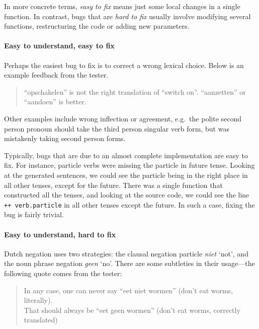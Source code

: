 In more concrete terms, \emph{easy to fix} means just some local changes
in a single function. In contrast, bugs that are \emph{hard to fix}
usually involve modifying several functions, restructuring the code or
adding new parameters.

\paragraph{Easy to understand, easy to
fix}\label{easy-to-understand-easy-to-fix}

Perhaps the easiest bug to fix is to correct a wrong lexical choice.
Below is an example feedback from the tester.

\begin{quote}
``opschakelen'' is not the right translation of ``switch on''.
``aanzetten'' or ``aandoen'' is better.
\end{quote}

Other examples include wrong inflection or agreement, e.g.~the polite
second person pronoun should take the third person singular verb form,
but was mistakenly taking second person forms.

Typically, bugs that are due to an almost complete implementation are
easy to fix. For instance, particle verbs were missing the particle in
future tense. Looking at the generated sentences, we could see the
particle being in the right place in all other tenses, except for the
future. There was a single function that constructed all the tenses, and
looking at the source code, we could see the line
\texttt{++ verb.particle} in all other tenses except the future. In such
a case, fixing the bug is fairly trivial.

\paragraph{Easy to understand, hard to
fix}\label{easy-to-understand-hard-to-fix}
Dutch negation uses two strategies: the clausal negation particle
\emph{niet} `not', and the noun phrase negation \emph{geen} `no'. There
are some subtleties in their usage---the following quote comes from the
tester:

\begin{quote}
In any case, one can never say ``eet niet wormen'' (don't eat worms,
literally).\\That should always be ``eet geen wormen'' (don't eat worms,
correctly translated)
\end{quote}

